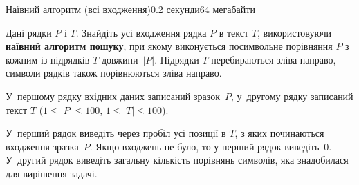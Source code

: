 \begin{problem}{Наївний алгоритм (всі входження)}{}{}{0.2 секунди}{64 мегабайти}

Дані рядки $P$ і $T$. Знайдіть усі входження рядка $P$ в текст $T$, використовуючи {\bf наївний алгоритм пошуку}, 
при якому виконується посимвольне порівняння $P$ з кожним із підрядків $T$ довжини~$|P|$.
Підрядки $T$ перебираються зліва направо, символи рядків також порівнюються зліва направо. 

\InputFile
У~першому рядку вхідних даних записаний зразок~$P$, 
у~другому рядку записаний текст $T$ ($1 \le |P| \le 100$, $1 \le |T| \le 100$).


\OutputFile
У~перший рядок виведіть через пробіл усі позиції в $T$, з яких починаються входження зразка~$P$. 
Якщо входжень не було, то у перший рядок виведіть~0.
У~другий рядок виведіть загальну кількість порівнянь символів, яка знадобилася для вирішення задачі. 

\Examples

\begin{example}
%
\end{example}

\end{problem}

